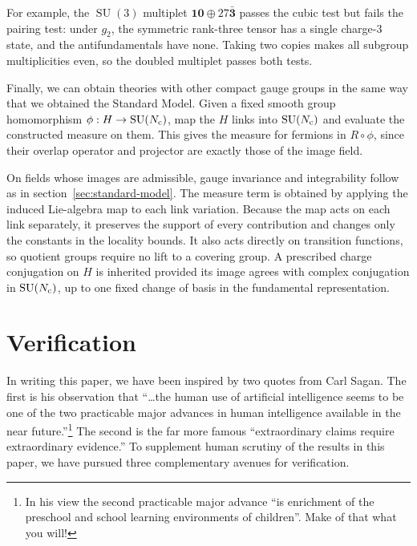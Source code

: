 \documentclass[11pt,a4paper]{article}
\theoremstyle{remark}
\DeclareMathOperator{\SU}{SU}
\begin{document}
For example, the $\SU(3)$ multiplet
$\mathbf{10}\oplus27\bar{\mathbf3}$ passes the cubic test but fails
the pairing test: under $g_2$, the symmetric rank-three tensor has a
single charge-$3$ state, and the antifundamentals have none. Taking two copies makes all subgroup multiplicities
even, so the doubled multiplet passes both tests.

Finally, we can obtain theories with other compact gauge groups in the
same way that we obtained the Standard Model. Given a fixed smooth group
homomorphism $\phi:H\to\SU(N_{\rm c})$, map the $H$ links into
$\SU(N_{\rm c})$ and evaluate the constructed measure on them. This
gives the measure for fermions in $R\circ\phi$, since their overlap
operator and projector are exactly those of the image field.

On fields whose images are admissible, gauge invariance and integrability
follow as in section~\ref{sec:standard-model}. The measure term is
obtained by applying the induced Lie-algebra map to each link variation.
Because the map acts on each link separately, it preserves the support
of every contribution and changes only the constants in the locality
bounds. It also acts directly on transition functions, so quotient
groups require no lift to a covering group. A prescribed charge
conjugation on $H$ is inherited provided its image agrees with complex
conjugation in $\SU(N_{\rm c})$, up to one fixed change of basis in
the fundamental representation.


\section{Verification}
\label{sec:verification}

In writing this paper, we have been inspired by two quotes from Carl Sagan. The first is his observation that ``\dots the human use of artificial intelligence seems to be one of the two practicable major advances in human intelligence available in the near future.''\footnote{In his view the second practicable major advance ``is enrichment of the preschool and school learning environments of children''\cite[chap.~8]{SaganDragonsOfEden}. Make of that what you will!} The second is the far more famous ``extraordinary claims require extraordinary evidence.'' To supplement human scrutiny of the results in this paper, we have pursued  three complementary avenues for verification.
\end{document}
